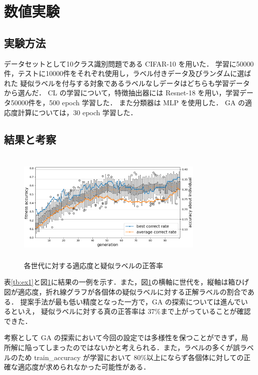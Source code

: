 \documentclass[a4paper,twoside,twocolumn,10pt]{jarticle}     %
\begin{document}
\section{数値実験}
\subsection{実験方法}
データセットとして10クラス識別問題である CIFAR-10 を用いた．
学習に50000件，テストに10000件をそれぞれ使用し，ラベル付きデータ及びランダムに選ばれた
疑似ラベルを付与する対象であるラベルなしデータはどちらも学習データから選んだ．
CL の学習について，特徴抽出器には Resnet-18 を用い，学習データ50000件を，500 epoch 学習した．
また分類器は MLP を使用した．
GA の適応度計算については，30 epoch 学習した．
\subsection{結果と考察}
\begin{figure}[t]
	\begin{center}
		\includegraphics[height=55mm,width=90mm]{graph.png}
		\caption{各世代に対する適応度と疑似ラベルの正答率\label{fig:ex1}}
	\end{center}
\end{figure}
表\ref{tb:ex1}と図\ref{fig:ex1}に結果の一例を示す．また，図\ref{fig:ex1}の横軸に世代を，縦軸は箱ひげ図が適応度，折れ線グラフが各個体の疑似ラベルに対する正解ラベルの割合である． 提案手法が最も低い精度となった一方で，GA の探索については進んでいるといえ，
疑似ラベルに対する真の正答率は 37\%まで上がっていることが確認できた．

考察として GA の探索において今回の設定では多様性を保つことができず，局所解に陥ってしまったのではないかと考えられる．また，ラベルの多くが誤ラベルのため train\_accuracy が学習において 80\%以上にならず各個体に対しての正確な適応度が求められなかった可能性がある．
\
\begin{table}[h]
	\centering
	\caption{テスト識別率結果\label{tb:ex1}}
\end{table}
\end{document}
